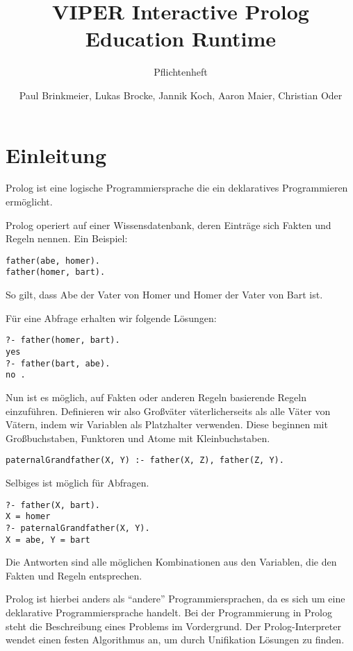\documentclass[parskip=full,11pt,twoside]{scrartcl}
\title{VIPER Interactive Prolog Education Runtime}
\subtitle{Pflichtenheft}
\author{Paul Brinkmeier, Lukas Brocke, Jannik Koch, Aaron Maier, Christian Oder}
\begin{document}
\maketitle

\section{Einleitung}

Prolog ist eine logische Programmiersprache die ein deklaratives Programmieren ermöglicht.

Prolog operiert auf einer Wissensdatenbank, deren Einträge sich Fakten und Regeln nennen. Ein Beispiel:

\begin{lstlisting}
father(abe, homer).
father(homer, bart).
\end{lstlisting}

So gilt, dass Abe der Vater von Homer und Homer der Vater von Bart ist.

Für eine Abfrage erhalten wir folgende Lösungen:

\begin{lstlisting}
?- father(homer, bart).
yes
?- father(bart, abe).
no .
\end{lstlisting}

Nun ist es möglich, auf Fakten oder anderen Regeln basierende Regeln einzuführen. Definieren wir also Großväter väterlicherseits als alle Väter von Vätern, indem wir Variablen als Platzhalter verwenden. Diese beginnen mit Großbuchstaben, Funktoren und Atome mit Kleinbuchstaben.

\begin{lstlisting}
paternalGrandfather(X, Y) :- father(X, Z), father(Z, Y).
\end{lstlisting}

Selbiges ist möglich für Abfragen.

\begin{lstlisting}
?- father(X, bart).
X = homer
?- paternalGrandfather(X, Y).
X = abe, Y = bart
\end{lstlisting}

Die Antworten sind alle möglichen Kombinationen aus den Variablen, die den Fakten und Regeln entsprechen.

Prolog ist hierbei anders als \enquote{andere} Programmiersprachen, da es sich um eine deklarative Programmiersprache handelt. Bei der Programmierung in Prolog steht die Beschreibung eines Problems im Vordergrund. Der Prolog-Interpreter wendet einen festen Algorithmus an, um durch Unifikation Lösungen zu finden.
\end{document}
